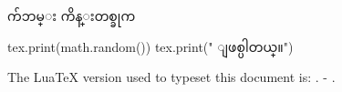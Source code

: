 \documentclass{article}
\begin{document}
က်ဘမ္း ကိန္းတစ္ခုက 
\begin{luacode}
tex.print(math.random())
tex.print(" ျဖစ္ပါတယ္။")
\end{luacode}


The LuaTeX version used to typeset this document is: \the \luatexversion. \luatexrevision- \luatexdatestamp.
\end{document}
